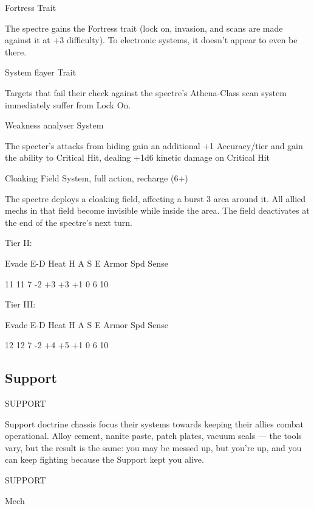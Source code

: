 Fortress  
Trait
 
The spectre gains the Fortress trait (lock on, invasion, and scans are made against it at +3  
difficulty). To electronic systems, it doesn’t appear to even be there.
 

System flayer  
Trait
 
Targets that fail their check against the spectre’s Athena-Class scan system immediately suffer  
from Lock On.
 

Weakness analyser  
System
 
The specter’s attacks from hiding gain an additional +1 Accuracy/tier and gain the ability to  
Critical Hit, dealing +1d6 kinetic damage on Critical Hit
 

Cloaking Field  
System, full action, recharge (6+)
 
The spectre deploys a cloaking field, affecting a burst 3 area around it. All allied mechs in that  
field become invisible while inside the area. The field deactivates at the end of the spectre’s next  
turn.
 

Tier II:
 

          Evade     E-D     Heat    H     A     S     E        Armor        Spd       Sense 

          11        11      7       -2    +3    +3    +1       0            6         10 

Tier III:
 

          Evade     E-D     Heat    H     A     S     E        Armor        Spd       Sense 

          12        12      7       -2    +4    +5    +1       0            6         10 

                                                                                                                     
\subsection{Support}

                                               SUPPORT  

Support doctrine chassis focus their systems towards keeping their allies combat operational.  
Alloy cement, nanite paste, patch plates, vacuum seals — the tools vary, but the result is the  
same: you may be messed up, but you’re up, and you can keep fighting because the Support  
kept you alive. 
 

 SUPPORT 

 Mech 

